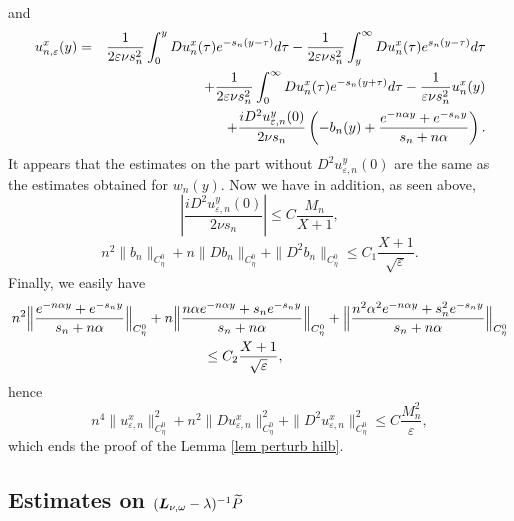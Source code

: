 \documentclass[11pt]{article}
\begin{document}
and 
\begin{eqnarray*}
u_{n,\varepsilon }^{x}(y) &=&\frac{1}{2\varepsilon \nu s_{n}^{2}}%
\int_{0}^{y}Du_{n}^{x}(\tau )e^{-s_{n}(y-\tau )}d\tau -\frac{1}{2\varepsilon
\nu s_{n}^{2}}\int_{y}^{\infty }Du_{n}^{x}(\tau )e^{s_{n}(y-\tau )}d\tau  \\
&&+\frac{1}{2\varepsilon \nu s_{n}^{2}}\int_{0}^{\infty }Du_{n}^{x}(\tau
)e^{-s_{n}(y+\tau )}d\tau -\frac{1}{\varepsilon \nu s_{n}^{2}}u_{n}^{x}(y) \\
&&+\frac{iD^{2}u_{\varepsilon ,n}^{y}(0)}{2\nu s_{n}}\left( -b_{n}(y)+\frac{%
e^{-n\alpha y}+e^{-s_{n}y}}{s_{n}+n\alpha }\right) .
\end{eqnarray*}%
It appears that the estimates on the part without $D^{2}u_{\varepsilon
,n}^{y}(0)$ are the same as the estimates obtained for $w_{n}(y).$ Now we
have in addition, as seen above,%
\begin{equation*}
\left\vert \frac{iD^{2}u_{\varepsilon ,n}^{y}(0)}{2\nu s_{n}}\right\vert
\leq C\frac{M_{n}}{X+1},
\end{equation*}%
\begin{equation*}
n^{2}\|b_{n}\|_{C_{\eta}^{0}}+n\|Db_{n}\|_{C_{\eta}^{0}}+\|D^{2}b_{n}\|_{C_{\eta}^{0}}\leq C_{1}%
\frac{X+1}{\sqrt{\varepsilon }}.
\end{equation*}%
Finally, we easily have 
\begin{align*}
n^{2}\Bigl\|\frac{e^{-n\alpha y}+e^{-s_{n}y}}{s_{n}+n\alpha }\Bigr\|_{C_{\eta}^{0}}
&+n \Bigl\| \frac{n\alpha e^{-n\alpha y}+s_{n}e^{-s_{n}y}}{s_{n}+n\alpha } \Bigr\|_{C_{\eta}^{0}}
+ \Bigl\|\frac{n^{2}\alpha ^{2}e^{-n\alpha y}+s_{n}^{2}e^{-s_{n}y}}{s_{n}+n\alpha } \Bigr\|_{C_{\eta}^{0}} \\
& \qquad \qquad \leq C_{2}\frac{X+1}{\sqrt{\varepsilon }},
\end{align*}%
hence %
\begin{equation*}
n^{4}\|u_{\varepsilon ,n}^{x}\|_{C_{\eta}^{0}}^{2}+n^{2}\|Du_{\varepsilon
,n}^{x}\|_{C_{\eta}^{0}}^{2}+\|D^{2}u_{\varepsilon
,n}^{x}\|_{C_{\eta}^{0}}^{2}\leq C\frac{M_{n}^{2}}{\varepsilon },
\end{equation*}%
which ends the proof of the Lemma \ref{lem perturb hilb}. %



\subsection{Estimates on $(\boldsymbol{L}_{\protect\nu ,\protect%
\omega }-\protect\lambda )^{-1}\widetilde{P}$}\label{app:complement}
\end{document}
